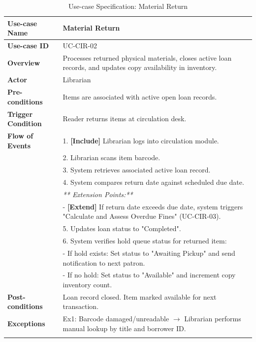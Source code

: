 \newpage
\begin{longtable}{|p{3.5cm}|p{11.5cm}|}
    \hline
    \textbf{Use-case Name} & \textbf{Material Return} \\
    \hline
    \textbf{Use-case ID} & UC-CIR-02 \\
    \hline
    \textbf{Overview} & Processes returned physical materials, closes active loan records, and updates copy availability in inventory. \\
    \hline
    \textbf{Actor} & Librarian \\
    \hline
    \textbf{Pre-conditions} & Items are associated with active open loan records. \\
    \hline
    \textbf{Trigger Condition} & Reader returns items at circulation desk. \\
    \hline
    \textbf{Flow of Events} & 
    1. \textbf{[Include]} Librarian logs into circulation module.\\ 
 & 
    2. Librarian scans item barcode.\\ 
 & 
    3. System retrieves associated active loan record.\\ 
 & 
    4. System compares return date against scheduled due date.\\ 
 & 
    \textit{** Extension Points:**}\\ 
 & 
    - \textbf{[Extend]} If return date exceeds due date, system triggers "Calculate and Assess Overdue Fines" (UC-CIR-03).\\ 
 & 
    5. Updates loan status to "Completed".\\ 
 & 
    6. System verifies hold queue status for returned item:\\ 
 & 
    - If hold exists: Set status to "Awaiting Pickup" and send notification to next patron.\\ 
 & 
    - If no hold: Set status to "Available" and increment copy inventory count. \\
    \hline
    \textbf{Post-conditions} & Loan record closed. Item marked available for next transaction. \\
    \hline
    \textbf{Exceptions} & 
    Ex1: Barcode damaged/unreadable $\rightarrow$ Librarian performs manual lookup by title and borrower ID. \\
    \hline
    \caption{Use-case Specification: Material Return} \\
\end{longtable}


